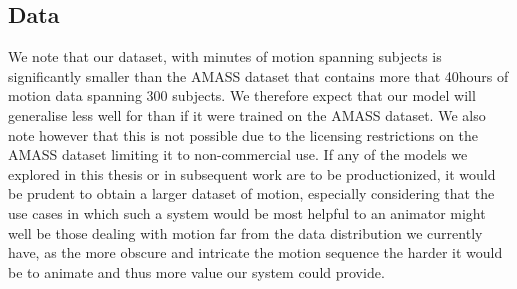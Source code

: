\subsection{Data}
We note that our dataset, with  minutes of motion spanning  subjects is significantly smaller than the AMASS \cite{amass} dataset that contains more that 40hours of motion data spanning 300 subjects. We therefore expect that our model will generalise less well for than if it were trained on the AMASS dataset. We also note however that this is not possible due to the licensing restrictions on the AMASS dataset limiting it to non-commercial use. If any of the models we explored in this thesis or in subsequent work are to be productionized, it would be prudent to obtain a larger dataset of motion, especially considering that the use cases in which such a system would be most helpful to an animator might well be those dealing with motion far from the data distribution we currently have, as the more obscure and intricate the motion sequence the harder it would be to animate and thus more value our system could provide.